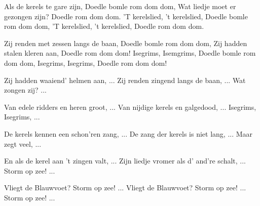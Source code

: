 \footnotemark [
ititle={Als de kerels te gare zijn}]


\beginverse
Als de kerels te gare zijn,
Doedle bomle rom dom dom,
Wat liedje moet er gezongen zijn?
Doedle rom dom dom.
'T kerelslied, 't kerelslied,
Doedle bomle rom dom dom,
'T kerelslied, 't kerelslied,
Doedle rom dom dom.
\endverse

\beginverse
Zij renden met zessen langs de baan,
Doedle bomle rom dom dom,
Zij hadden stalen kleren aan,
Doedle rom dom dom!
Isegrims, Isemgrims,
Doedle bomle rom dom dom,
Isegrims, Isegrims,
Doedle rom dom dom!
\endverse

\beginverse
Zij hadden waaiend' helmen aan, ...
Zij renden zingend langs de baan, ...
Wat zongen zij? ...
\endverse

\beginverse
Van edele ridders en heren groot, ...
Van nijdige kerels en galgedood, ...
Isegrims, Isegrims, ...
\endverse

\beginverse
De kerels kennen een schon'ren zang, ...
De zang der kerels is niet lang, ...
Maar zegt veel, ...
\endverse

\beginverse
En als de kerel aan 't zingen valt, ...
Zijn liedje vromer als d' and're schalt, ...
Storm op zee! ...
\endverse

\beginverse
Vliegt de Blauwvoet? Storm op zee! ...
Vliegt de Blauwvoet? Storm op zee! ...
Storm op zee! ...
\endverse
\endsong